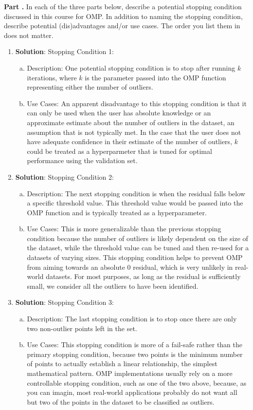 \documentclass[11pt,letterpaper]{article}
\newcounter{problem}
\newcommand{\problem}{
	\stepcounter{problem}%
	\noindent \textbf{Part \theproblem. }%
}
\begin{document}
\problem In each of the three parts below, describe a potential stopping condition discussed in this course for OMP. In addition to naming the stopping condition, describe potential (dis)advantages and/or use cases. The order you list them in does not matter.
	\begin{enumerate}
	\item \textbf{Solution}: Stopping Condition 1:
	    \begin{enumerate}[(a)]
	        \item Description: One potential stopping condition is to stop after running $k$ iterations, where $k$ is the parameter passed into the OMP function representing either the number of outliers.
	        \item Use Cases: An apparent disadvantage to this stopping condition is that it can only be used when the user has absolute knowledge or an approximate estimate about the number of outliers in the dataset, an assumption that is not typically met. In the case that the user does not have adequate confidence in their estimate of the number of outliers, $k$ could be treated as a hyperparmeter that is tuned for optimal performance using the validation set. 
	    \end{enumerate}
	\item \textbf{Solution}: Stopping Condition 2:
	    \begin{enumerate}[(a)]
	        \item Description: The next stopping condition is when the residual falls below a specific threshold value. This threshold value would be passed into the OMP function and is typically treated as a hyperparameter.
	        \item Use Cases: This is more generalizable than the previous stopping condition because the number of outliers is likely dependent on the size of the dataset, while the threshold value can be tuned and then re-used for a datasets of varying sizes. This stopping condition helps to prevent OMP from aiming towards an absolute 0 residual, which is very unlikely in real-world datasets. For most purposes, as long as the residual is sufficiently small, we consider all the outliers to have been identified.
	    \end{enumerate}
	\item \textbf{Solution}: Stopping Condition 3:
	    \begin{enumerate}[(a)]
	        \item Description: The last stopping condition is to stop once there are only two non-outlier points left in the set.
	        \item Use Cases: This stopping condition is more of a fail-safe rather than the primary stopping condition, because two points is the minimum number of points to actually establish a linear relationship, the simplest mathematical pattern. OMP implementations usually rely on a more controllable stopping condition, such as one of the two above, because, as you can imagin, most real-world applications probably do not want all but two of the points in the dataset to be classified as outliers.
	    \end{enumerate}
	\end{enumerate}
\end{document}
